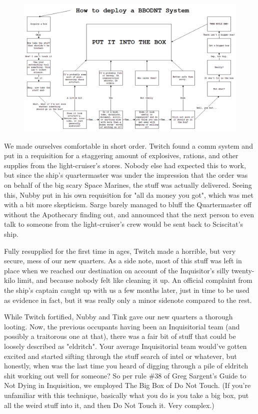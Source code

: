 \begin{figure}
	\begin{center}
		\includegraphics[width=\figwidth]{pics/17/25-large.png}
	\end{center}
\end{figure}
We made ourselves comfortable in short order. 
Twitch found a comm system and put in a requisition for a staggering amount of explosives, rations, and other supplies from the light-cruiser's stores. 
Nobody else had expected this to work, but since the ship's quartermaster was under the impression that the order was on behalf of the big scary Space Marines, the stuff was actually delivered. 
Seeing this, Nubby put in his own requisition for "all da money you got", which was met with a bit more skepticism. 
Sarge barely managed to bluff the Quartermaster off without the Apothecary finding out, and announced that the next person to even talk to someone from the light-cruiser's crew would be sent back to Sciscitat's ship.

Fully resupplied for the first time in ages, Twitch made a horrible, but very secure, mess of our new quarters. 
As a side note, most of this stuff was left in place when we reached our destination on account of the Inquisitor's silly twenty-kilo limit, and because nobody felt like cleaning it up. 
An official complaint  from the ship's captain caught up with us a few months later, just in time to be used as evidence in fact, but it was really only a minor sidenote compared to the rest.

While Twitch fortified, Nubby and Tink gave our new quarters a thorough looting. 
Now, the previous occupants having been an Inquisitorial team (and possibly a traitorous one at that), there was a fair bit of stuff that could be loosely described as "eldritch". 
Your average Inquisitorial team would've gotten excited and started sifting through the stuff search of intel or whatever, but honestly, when was the last time you heard of digging through a pile of eldritch shit working out well for someone? 
So per rule \#38 of Greg Sargent's Guide to Not Dying in Inquisition, we employed The Big Box of Do Not Touch. 
(If you're unfamiliar with this technique, basically what you do is you take a big box, put all the weird stuff into it, and then Do Not Touch it. 
Very complex.)

